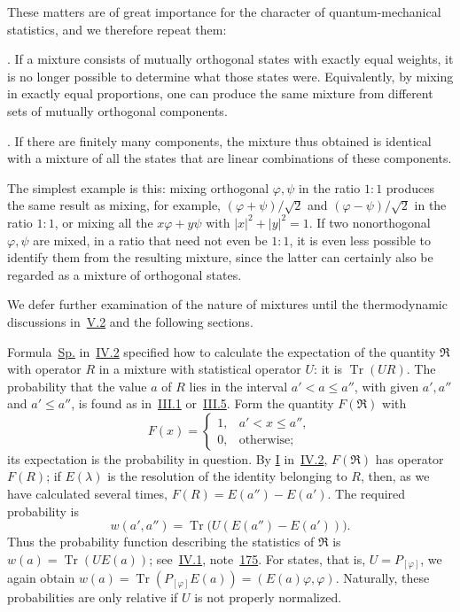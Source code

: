 \documentclass[fontsize=13pt,twoside,openany,headings=normal,parskip=false,bookmarkpackage=false,DIV=calc]{scrbook}
\begin{document}
These matters are of great importance for the character of quantum-mechanical statistics, and we therefore repeat them:

. If a mixture consists of mutually orthogonal states with exactly equal weights, it is no longer possible to determine what those states were. Equivalently, by mixing in exactly equal
\hypertarget{origpage-176}{}%
proportions, one can produce the same mixture from different sets of mutually orthogonal components.

. If there are finitely many components, the mixture thus obtained is identical with a mixture of all the states that are linear combinations of these components.

The simplest example is this: mixing orthogonal $\varphi,\psi$ in the ratio $1:1$ produces the same result as mixing, for example, $(\varphi+\psi)/\sqrt2$ and $(\varphi-\psi)/\sqrt2$ in the ratio $1:1$, or mixing all the $x\varphi+y\psi$ with $|x|^2+|y|^2=1$. If two nonorthogonal $\varphi,\psi$ are mixed, in a ratio that need not even be $1:1$, it is even less possible to identify them from the resulting mixture, since the latter can certainly also be regarded as a mixture of orthogonal states.

We defer further examination of the nature of mixtures until the thermodynamic discussions in~\hyperref[sec:V.2]{V.2} and the following sections.

Formula~\hyperref[eq:IV.2.Sp]{Sp.} in~\hyperref[sec:IV.2]{IV.2} specified how to calculate the expectation of the quantity $\mathfrak R$ with operator $R$ in a mixture with statistical operator $U$: it is $\operatorname{Tr}(UR)$. The probability that the value $a$ of $R$ lies in the interval $a'<a\leq a''$, with given $a',a''$ and $a'\leq a''$, is found as in~\hyperref[sec:III.1]{III.1} or~\hyperref[sec:III.5]{III.5}. Form the quantity $F(\mathfrak R)$ with
\[
F(x)=\begin{cases}1,&a'<x\leq a'',\\0,&\text{otherwise};\end{cases}
\]
its expectation is the probability in question. By \hyperref[cond:IV.2.I]{I} in~\hyperref[sec:IV.2]{IV.2}, $F(\mathfrak R)$ has operator $F(R)$; if $E(\lambda)$ is the resolution of the identity belonging to $R$, then, as we have calculated several times, $F(R)=E(a'')-E(a')$. The required probability is
\[
w(a',a'')=\operatorname{Tr}\bigl(U(E(a'')-E(a'))\bigr).
\]
Thus the probability function describing the statistics of $\mathfrak R$ is $w(a)=\operatorname{Tr}(UE(a))$; see~\hyperref[sec:IV.1]{IV.1}, note~\hyperlink{note-175}{175}. For states, that is, $U=P_{[\varphi]}$, we again obtain $w(a)=\operatorname{Tr}(P_{[\varphi]}E(a))=(E(a)\varphi,\varphi)$. Naturally, these probabilities are only relative if $U$ is not properly normalized.
\end{document}
